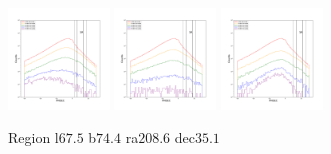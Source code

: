\documentclass[12pt,prd]{article}
\begin{document}
\begin{figure}[h!]
\includegraphics[width=0.24\textwidth]{../figures/scanning_plotsgaiascan_l67_5_b74_4_ra208_6_dec35_1_npy_15.pdf}
\includegraphics[width=0.24\textwidth]{../figures/scanning_plotsgaiascan_l67_5_b74_4_ra208_6_dec35_1_npy_16.pdf}
\includegraphics[width=0.24\textwidth]{../figures/scanning_plotsgaiascan_l67_5_b74_4_ra208_6_dec35_1_npy_17.pdf}
\caption{Region l$67.5$ b$74.4$ ra$208.6$ dec$35.1$}
\end{figure}
\end{document}
